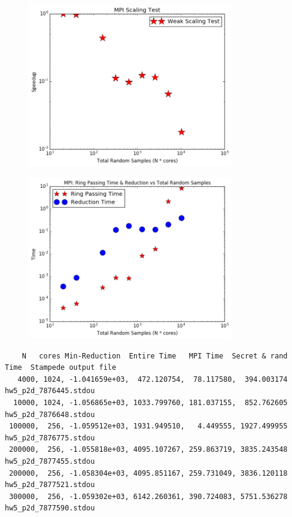 \documentclass{article}
\begin{document}
\begin{figure}[htb]
	\begin{center}
		\includegraphics[width=0.8\textwidth]{hw5_p2c_1.png}
	\end{center}
\end{figure}

\begin{figure}[htb]
	\begin{center}
		\includegraphics[width=0.8\textwidth]{hw5_p2c_2.png}
	\end{center}
\end{figure}

\begin{lstlisting}
    N   cores Min-Reduction  Entire Time   MPI Time  Secret & rand Time  Stampede output file
   4000, 1024, -1.041659e+03,  472.120754,  78.117580,  394.003174      hw5_p2d_7876445.stdou
  10000, 1024, -1.056865e+03, 1033.799760, 181.037155,  852.762605      hw5_p2d_7876648.stdou
 100000,  256, -1.059512e+03, 1931.949510,   4.449555, 1927.499955      hw5_p2d_7876775.stdou
 200000,  256, -1.055818e+03, 4095.107267, 259.863719, 3835.243548      hw5_p2d_7877455.stdou
 200000,  256, -1.058304e+03, 4095.851167, 259.731049, 3836.120118      hw5_p2d_7877521.stdou
 300000,  256, -1.059302e+03, 6142.260361, 390.724083, 5751.536278      hw5_p2d_7877590.stdou
\end{lstlisting}
\end{document}
